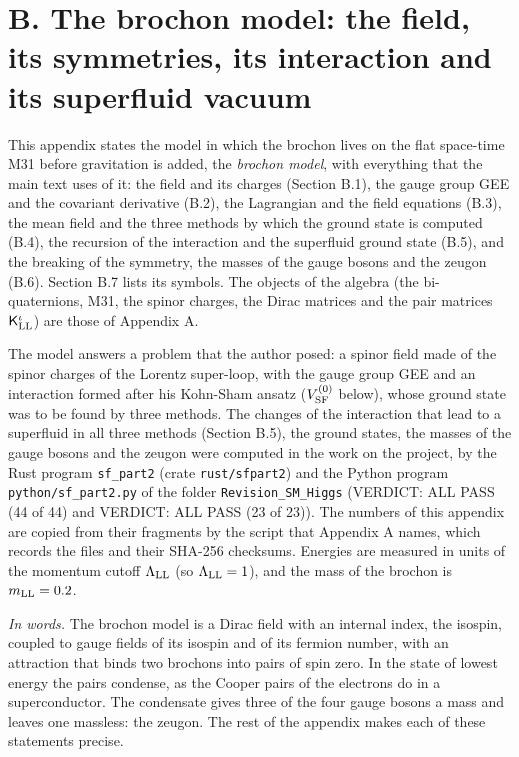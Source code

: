 \documentclass[
  10pt,
]{article}
\begin{document}
\hypertarget{b.-the-brochon-model-the-field-its-symmetries-its-interaction-and-its-superfluid-vacuum}{%
\section{B. The brochon model: the field, its symmetries, its
interaction and its superfluid
vacuum}\label{b.-the-brochon-model-the-field-its-symmetries-its-interaction-and-its-superfluid-vacuum}}

This appendix states the model in which the brochon lives on the flat
space-time M31 before gravitation is added, the \emph{brochon model},
with everything that the main text uses of it: the field and its charges
(Section B.1), the gauge group GEE and the covariant derivative (B.2),
the Lagrangian and the field equations (B.3), the mean field and the
three methods by which the ground state is computed (B.4), the recursion
of the interaction and the superfluid ground state (B.5), and the
breaking of the symmetry, the masses of the gauge bosons and the zeugon
(B.6). Section B.7 lists its symbols. The objects of the algebra (the
bi-quaternions, M31, the spinor charges, the Dirac matrices and the pair
matrices \(\mathsf K^\iota_{\rm LL}\)) are those of Appendix A.

The model answers a problem that the author posed: a spinor field made
of the spinor charges of the Lorentz super-loop, with the gauge group
GEE and an interaction formed after his Kohn-Sham ansatz
(\(V^{(0)}_{\rm SF}\) below), whose ground state was to be found by
three methods. The changes of the interaction that lead to a superfluid
in all three methods (Section B.5), the ground states, the masses of the
gauge bosons and the zeugon were computed in the work on the project, by
the Rust program \texttt{sf\_part2} (crate \texttt{rust/sfpart2}) and
the Python program \texttt{python/sf\_part2.py} of the folder
\texttt{Revision\_SM\_Higgs} (VERDICT: ALL PASS (44 of 44) and VERDICT:
ALL PASS (23 of 23)). The numbers of this appendix are copied from their
fragments by the script that Appendix A names, which records the files
and their SHA-256 checksums. Energies are measured in units of the
momentum cutoff \(\Lambda_{\rm LL}\) (so \(\Lambda_{\rm LL}=1\)), and
the mass of the brochon is \(m_{\rm LL}=0.2\).

\emph{In words.} The brochon model is a Dirac field with an internal
index, the isospin, coupled to gauge fields of its isospin and of its
fermion number, with an attraction that binds two brochons into pairs of
spin zero. In the state of lowest energy the pairs condense, as the
Cooper pairs of the electrons do in a superconductor. The condensate
gives three of the four gauge bosons a mass and leaves one massless: the
zeugon. The rest of the appendix makes each of these statements precise.
\end{document}
